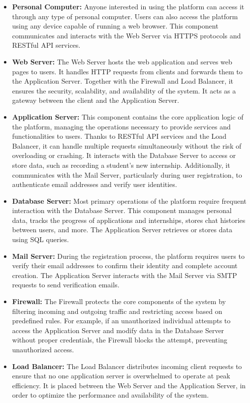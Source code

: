\begin{itemize}
    \item \textbf{Personal Computer:} Anyone interested in using the platform can access it through any type of personal computer. Users can also access the 
    platform using any device capable of running a web browser. This component communicates and interacts with the Web Server via HTTPS protocols and RESTful 
    API services.
    \item \textbf{Web Server:} The Web Server hosts the web application and serves web pages to users. It handles HTTP requests from clients and forwards them 
    to the Application Server. Together with the Firewall and Load Balancer, it ensures the security, scalability, and availability of the system. It acts as 
    a gateway between the client and the Application Server.
    \item \textbf{Application Server:} This component contains the core application logic of the platform, managing the operations necessary to provide services 
    and functionalities to users. Thanks to RESTful API services and the Load Balancer, it can handle multiple requests simultaneously without the risk of 
    overloading or crashing. It interacts with the Database Server to access or store data, such as recording a student's new internship. Additionally, it 
    communicates with the Mail Server, particularly during user registration, to authenticate email addresses and verify user identities.
    \item \textbf{Database Server:} Most primary operations of the platform require frequent interaction with the Database Server. This component manages 
    personal data, tracks the progress of applications and internships, stores chat histories between users, and more. The Application Server retrieves or 
    stores data using SQL queries.
    \item \textbf{Mail Server:} During the registration process, the platform requires users to verify their email addresses to confirm their identity and 
    complete account creation. The Application Server interacts with the Mail Server via SMTP requests to send verification emails.
    \item \textbf{Firewall:} The Firewall protects the core components of the system by filtering incoming and outgoing traffic and restricting access based on 
    predefined rules. For example, if an unauthorized individual attempts to access the Application Server and modify data in the Database Server without proper 
    credentials, the Firewall blocks the attempt, preventing unauthorized access.
    \item \textbf{Load Balancer:} The Load Balancer distributes incoming client requests to ensure that no one application server is overwhelmed to operate at 
    peak efficiency. It is placed between the Web Server and the Application Server, in order to optimize the performance and availability of the system.
\end{itemize}

